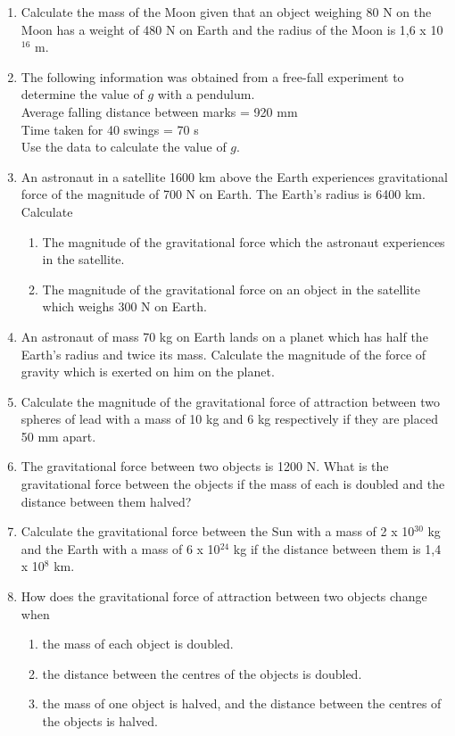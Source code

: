 \begin{enumerate}
\item {Calculate the mass of the Moon given that an object weighing 80 N on the Moon has a weight of 480 N on Earth and the radius of the Moon is 1,6 x 10$^{16}$ m.}

\item {The following information was obtained from a free-fall experiment to determine the value of $g$ with a pendulum.\\
Average falling distance between marks = 920 mm\\
Time taken for 40 swings = 70 s\\
Use the data to calculate the value of $g$.}	%

\item {An astronaut in a satellite 1600 km above the Earth experiences gravitational force of the magnitude of 700 N on Earth.  The Earth's radius is 6400 km.  Calculate
\begin{enumerate}
\item The magnitude of the gravitational force which the astronaut experiences in the satellite.	
\item The magnitude of the gravitational force on an object in the satellite which weighs 300 N on Earth.
\end{enumerate}}

\item {An astronaut of mass 70 kg on Earth lands on a planet which has half the Earth's radius and twice its mass.  Calculate the magnitude of the force of gravity which is exerted on him on the planet.}

\item {Calculate the magnitude of the gravitational force of attraction between two spheres of lead with a mass of 10 kg and 6 kg respectively if they are placed 50 mm apart.}

\item {The gravitational force between two objects is 1200 N.  What is the gravitational force between the objects if the mass of each is doubled and the distance between them halved?	}

\item {Calculate the gravitational force between the Sun with a mass of 2 x 10$^{30}$ kg and the Earth with a mass of 6 x 10$^{24}$ kg if the distance between them is 1,4 x 10$^8$ km.	}

\item {How does the gravitational force of attraction between two objects change when
\begin{enumerate}
\item the mass of each object is doubled.
\item the distance between the centres of the objects is doubled.
\item the mass of one object is halved, and the distance between the centres of the objects is halved.
\end{enumerate}}


\end{enumerate}
